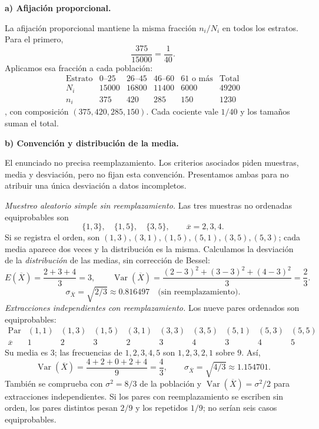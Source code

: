 \textbf{a) Afijación proporcional.}\par\nopagebreak[4]
La afijación proporcional mantiene la misma fracción $n_i/N_i$ en todos los estratos. Para el primero,
\[
\frac{375}{15000}=\frac1{40}.
\]
Aplicamos esa fracción a cada población:
\[
\begin{array}{c|rrrr|r}
\text{Estrato}&0\text{--}25&26\text{--}45&46\text{--}60&61\text{ o más}&\text{Total}\\\hline
N_i&15000&16800&11400&6000&49200\\
n_i&375&420&285&150&1230
\end{array}
\]
, con composición $(375,420,285,150)$. Cada cociente vale $1/40$ y los tamaños suman el total.

\textbf{b) Convención y distribución de la media.}\par\nopagebreak[4]
El enunciado no precisa reemplazamiento. Los criterios asociados piden muestras, media y desviación, pero no fijan esta convención. Presentamos ambas para no atribuir una única desviación a datos incompletos.

\emph{Muestreo aleatorio simple sin reemplazamiento.} Las tres muestras no ordenadas equiprobables son
\[
\{1,3\},\quad\{1,5\},\quad\{3,5\},
\qquad\overline x=2,3,4.
\]
Si se registra el orden, son $(1,3),(3,1),(1,5),(5,1),(3,5),(5,3)$; cada media aparece dos veces y la distribución es la misma. Calculamos la desviación de la \emph{distribución} de las medias, sin corrección de Bessel:
\[
E(\overline X)=\frac{2+3+4}{3}=3,\qquad
\operatorname{Var}(\overline X)=\frac{(2-3)^2+(3-3)^2+(4-3)^2}{3}=\frac23.
\]
\[
\boxed{\sigma_{\overline X}=\sqrt{2/3}\approx0.816497\quad\text{(sin reemplazamiento)}.}
\]
\emph{Extracciones independientes con reemplazamiento.} Los nueve pares ordenados son equiprobables:
\[
\begin{array}{c|rrrrrrrrr}
\text{Par}&(1,1)&(1,3)&(1,5)&(3,1)&(3,3)&(3,5)&(5,1)&(5,3)&(5,5)\\\hline
\overline x&1&2&3&2&3&4&3&4&5
\end{array}
\]
Su media es $3$; las frecuencias de $1,2,3,4,5$ son $1,2,3,2,1$ sobre $9$. Así,
\[
\operatorname{Var}(\overline X)=\frac{4+2+0+2+4}{9}=\frac43,
\qquad\boxed{\sigma_{\overline X}=\sqrt{4/3}\approx1.154701.}
\]
También se comprueba con $\sigma^2=8/3$ de la población y $\operatorname{Var}(\overline X)=\sigma^2/2$ para extracciones independientes. Si los pares con reemplazamiento se escriben sin orden, los pares distintos pesan $2/9$ y los repetidos $1/9$; no serían seis casos equiprobables.
